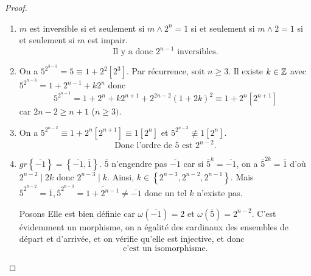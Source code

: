 \begin{proof}
	\phantom{}
	\begin{enumerate}
		\item $m$ est inversible si et seulement si $m\wedge 2^{n}=1$ si et seulement si $m\wedge 2=1$ si et seulement si $m$ est impair. 
		\begin{equation}
			\boxed{\text{Il y a donc }2^{n-1}\text{ inversibles.}}
		\end{equation}
		\item On a $5^{2^{3-3}}=5\equiv1+2^{2}[2^{3}]$. Par récurrence, soit $n\geqslant3$. Il existe $k\in\mathbb{Z}$ avec $5^{2^{n-3}}=1+2^{n-1}+k2^{n}$ donc 
		\begin{equation}
			\boxed{
			5^{2^{n-1}}=1+2^{n}+k2^{n+1}+2^{2n-2}(1+2k)^{2}\equiv 1+2^{n}[2^{n+1}]}
		\end{equation}
		car $2n-2\geqslant n+1$ ($n\geqslant3)$.

		\item On a $5^{2^{n-2}}\equiv 1+2^{n}[2^{n+1}]\equiv 1[2^{n}]$ et $5^{2^{n-3}}\not\equiv1[2^{n}]$. 
		\begin{equation}
			\boxed{\text{Donc l'ordre de }\overline{5}\text{ est }2^{n-2}.}
		\end{equation}
		
		\item $gr\left\{\overline{-1}\right\}=\left\{\overline{-1},\overline{1}\right\}$. $\overline{5}$ n'engendre pas $\overline{-1}$ car si $\overline{5}^{k}=\overline{-1}$, on a $\overline{5}^{2k}=\overline{1}$ d'où $2^{n-2}\mid 2k$ donc $2^{n-3}\mid k$. Ainsi, $k\in\left\{2^{n-3},2^{n-2},2^{n-1}\right\}$. Mais $\overline{5}^{2^{n-2}}=\overline{1},\overline{5}^{2^{n-3}}=\overline{1+2^{n-1}}\neq\overline{-1}$ donc un tel $k$ n'existe pas.
		
		Posons 
		Elle est bien définie car $\omega(\overline{-1})=2$ et $\omega(\overline{5})=2^{n-2}$. C'est évidemment un morphisme, on a égalité des cardinaux des ensembles de départ et d'arrivée, et on vérifie qu'elle est injective, et donc 
		\begin{equation}
			\boxed{\text{c'est un isomorphisme.}}
		\end{equation}
	\end{enumerate}
\end{proof}

